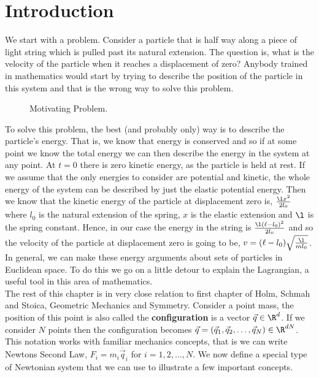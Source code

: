 
\section{Introduction}

We start with a problem. Consider a particle that is half way along a piece of light string which is pulled past its natural extension. The question is, what is the velocity of the particle when it reaches a displacement of zero? Anybody trained in mathematics would start by trying to describe the position of the particle in this system and that is the wrong way to solve this problem.\\

\begin{figure}[!ht]
\centering
\resizebox{0.2\textwidth}{!}{}
\caption{Motivating Problem.}
\end{figure}

\noindent
To solve this problem, the best (and probably only) way is to describe the particle's energy. That is, we know that energy is conserved and so if at some point we know the total energy we can then describe the energy in the system at any point. At $t = 0$ there is zero kinetic energy, as the particle is held at rest. If we assume that the only energies to consider are potential and kinetic, the whole energy of the system can be described by just the elastic potential energy. Then we know that the kinetic energy of the particle at displacement zero is, $\frac{\l x^2}{2l_0}$ where $l_0$ is the natural extension of the spring, $x$ is the elastic extension and $\l$ is the spring constant. Hence, in our case the energy in the string is $\frac{\l (\ell - l_0)^2}{2l_0}$ and so the velocity of the particle at displacement zero is going to be, $v = (\ell - l_0)\sqrt{\frac{\l}{ml_0}}$. In general, we can make these energy arguments about sets of particles in Euclidean space. To do this we go on a little detour to explain the Lagrangian, a useful tool in this area of mathematics.\\

\noindent
The rest of this chapter is in very close relation to first chapter of Holm, Schmah and Stoica, Geometric Mechanics and Symmetry. Consider a point mass, the position of this point is also called the \textbf{configuration} is a vector $\vec q \in \R^d$. If we consider $N$ points then the configuration becomes $\vec q = (\vec q_1, \vec q_2, \dots, \vec q_N) \in \R^{dN}$. This notation works with familiar mechanics concepts, that is we can write Newtons Second Law, $F_i = m_i\ddot{\vec q_i}$ for $i = 1, 2, \dots, N$. We now define a special type of Newtonian system that we can use to illustrate a few important concepts.

